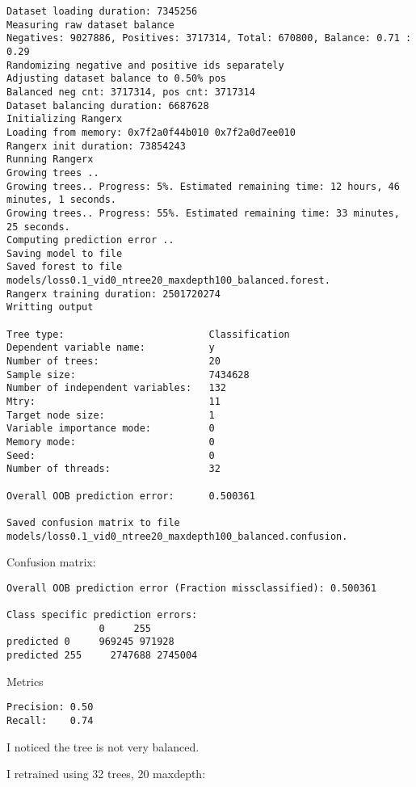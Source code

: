 \documentclass[12pt,oneside]{book}
\begin{document}
\begin{lstlisting}
Dataset loading duration: 7345256
Measuring raw dataset balance
Negatives: 9027886, Positives: 3717314, Total: 670800, Balance: 0.71 : 0.29
Randomizing negative and positive ids separately
Adjusting dataset balance to 0.50% pos
Balanced neg cnt: 3717314, pos cnt: 3717314
Dataset balancing duration: 6687628
Initializing Rangerx
Loading from memory: 0x7f2a0f44b010 0x7f2a0d7ee010
Rangerx init duration: 73854243
Running Rangerx
Growing trees ..
Growing trees.. Progress: 5%. Estimated remaining time: 12 hours, 46 minutes, 1 seconds.
Growing trees.. Progress: 55%. Estimated remaining time: 33 minutes, 25 seconds.
Computing prediction error ..
Saving model to file
Saved forest to file models/loss0.1_vid0_ntree20_maxdepth100_balanced.forest.
Rangerx training duration: 2501720274
Writting output

Tree type:                         Classification
Dependent variable name:           y
Number of trees:                   20
Sample size:                       7434628
Number of independent variables:   132
Mtry:                              11
Target node size:                  1
Variable importance mode:          0
Memory mode:                       0
Seed:                              0
Number of threads:                 32

Overall OOB prediction error:      0.500361

Saved confusion matrix to file models/loss0.1_vid0_ntree20_maxdepth100_balanced.confusion.
\end{lstlisting}
Confusion matrix:
\begin{lstlisting}
Overall OOB prediction error (Fraction missclassified): 0.500361

Class specific prediction errors:
                0     255
predicted 0     969245 971928 
predicted 255     2747688 2745004
\end{lstlisting}

Metrics
\begin{lstlisting}
Precision: 0.50
Recall:    0.74
\end{lstlisting}

I noticed the tree is not very balanced.

I retrained using 32 trees, 20 maxdepth:
\end{document}
